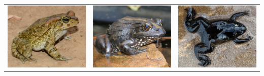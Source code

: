 \documentclass[
]{krantz}
\begin{document}
\begin{longtable}[]{@{}lll@{}}
\midrule
\endfirsthead
\toprule
\includegraphics{figures/S-capensis.png} & \includegraphics{figures/A-quecketti.png} & \includegraphics{figures/X-laevis.png} \\

\end{longtable}
\end{document}
